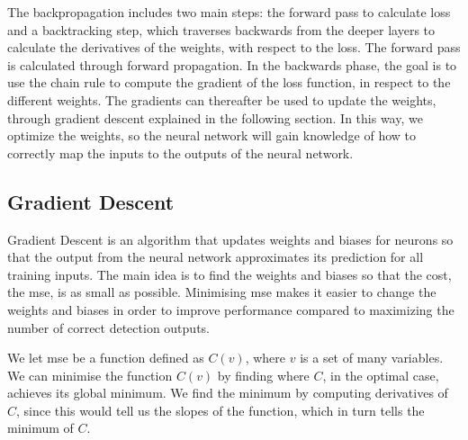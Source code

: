 
The backpropagation includes two main steps: the forward pass to calculate loss and a backtracking step, which traverses backwards from the deeper layers to calculate the derivatives of the weights, with respect to the loss. The forward pass is calculated through forward propagation.
In the backwards phase, the goal is to use the chain rule to compute the gradient of the loss function, in respect to the different weights. The gradients can thereafter be used to update the weights, through gradient descent explained in the following section. In this way, we optimize the weights, so the neural network will gain knowledge of how to correctly map the inputs to the outputs of the neural network.\cite{nnadl}

\subsection{Gradient Descent}
Gradient Descent is an algorithm that updates weights and biases for neurons so that the output from the neural network approximates its prediction for all training inputs. The main idea is to find the weights and biases so that the cost, the \gls{mse}, is as small as possible. Minimising \gls{mse} makes it easier to change the weights and biases in order to improve performance compared to maximizing the number of correct detection outputs.\cite{ann}

We let \gls{mse} be a function defined as $C(v)$, where $v$ is a set of many variables. We can minimise the function $C(v)$ by finding where $C$, in the optimal case, achieves its global minimum. We find the minimum by computing derivatives of $C$, since this would tell us the slopes of the function, which in turn tells the minimum of $C$.\cite{ann}